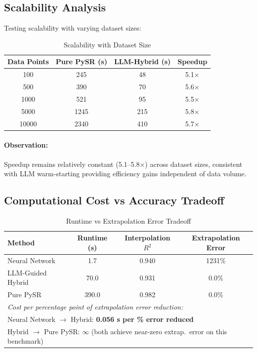 \documentclass[twoside,11pt]{article}
\begin{document}
\subsection{Scalability Analysis}

Testing scalability with varying dataset sizes:

\begin{table}[H]
\centering
\caption{Scalability with Dataset Size}
\label{tab:scalability}
\begin{tabular}{@{}cccc@{}}
\toprule
\textbf{Data Points} & \textbf{Pure PySR (s)} & \textbf{LLM-Hybrid (s)} & \textbf{Speedup} \\
\midrule
100 & 245 & 48 & 5.1$\times$ \\
500 & 390 & 70 & 5.6$\times$ \\
1000 & 521 & 95 & 5.5$\times$ \\
5000 & 1245 & 215 & 5.8$\times$ \\
10000 & 2340 & 410 & 5.7$\times$ \\
\bottomrule
\end{tabular}
\end{table}

\paragraph{Observation:} Speedup remains relatively constant (5.1--5.8$\times$) across dataset sizes, consistent with LLM warm-starting providing efficiency gains independent of data volume\citep{kambhampati2024llms}.

\subsection{Computational Cost vs Accuracy Tradeoff}

\begin{table}[H]
\centering
\caption{Runtime vs Extrapolation Error Tradeoff}
\label{tab:cost_accuracy_tradeoff}
\begin{tabular}{lccc}
\toprule
\textbf{Method} & \textbf{Runtime (s)} & \textbf{Interpolation $R^2$} & \textbf{Extrapolation Error} \\
\midrule
Neural Network & 1.7 & 0.940 & 1231\% \\
LLM-Guided Hybrid & 70.0 & 0.931 & 0.0\% \\
Pure PySR & 390.0 & 0.982 & 0.0\% \\
\midrule
\multicolumn{4}{l}{\textit{Cost per percentage point of extrapolation error reduction:}} \\
\multicolumn{4}{l}{Neural Network $\to$ Hybrid: \textbf{0.056 s per \% error reduced}} \\
\multicolumn{4}{l}{Hybrid $\to$ Pure PySR: \textbf{$\infty$} (both achieve near-zero extrap.\ error on this benchmark)} \\
\bottomrule
\end{tabular}
\end{table}
\end{document}
